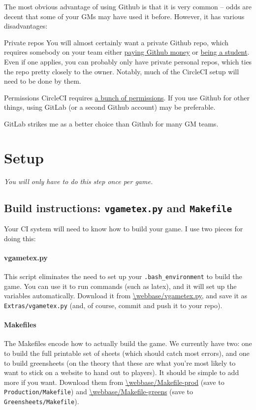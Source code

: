 \documentclass[green]{testgame}
\begin{document}
The most obvious advantage of using Github is that it is very common -- odds are decent that some of your GMs may have used it before. However, it has various disadvantages:
\begin{desc}
    \item[Private repos] You will almost certainly want a private Github repo, which requires somebody on your team either \href{https://github.com/pricing}{paying Github money} or \href{https://education.github.com/pack}{being a student}. Even if one applies, you can probably only have private personal repos, which ties the repo pretty closely to the owner. Notably, much of the CircleCI setup will need to be done by them.
    \item[Permissions] CircleCI requires \href{https://circleci.com/docs/github-permissions/}{a bunch of permissions}. If you use Github for other things, using GitLab (or a second Github account) may be preferable.
\end{desc}

GitLab strikes me as a better choice than Github for many GM teams.

\section{Setup}

\emph{You will only have to do this step once per game.}

\subsection{Build instructions: \texttt{vgametex.py} and \texttt{Makefile}}

Your CI system will need to know how to build your game. I use two pieces for doing this:

\paragraph*{vgametex.py} This script eliminates the need to set up your \texttt{.bash\_environment} to build the game. You can use it to run commands (such as latex), and it will set up the \GameTeX{} variables automatically. Download it from \url{\webbase/vgametex.py}, and save it as \texttt{Extras/vgametex.py} (and, of course, commit and push it to your repo).

\paragraph*{Makefiles} The Makefiles encode how to actually build the game. We currently have two: one to build the full printable set of sheets (which should catch most errors), and one to build greensheets (on the theory that these are what you're most likely to want to stick on a website to hand out to players). It should be simple to add more if you want. Download them from \url{\webbase/Makefile-prod} (save to \texttt{Production/Makefile}) and \url{\webbase/Makefile-greens} (save to \texttt{Greensheets/Makefile}).
\end{document}
